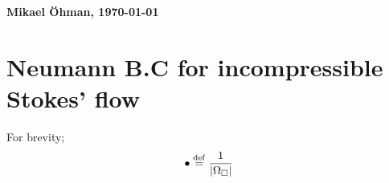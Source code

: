 \documentclass[a4paper]{article}
\newcommand{\surf}{\mathrm{s}}
\newcommand{\pore}{\mathrm{pore}}
\newcommand{\particle}{\mathrm{part}}
\begin{document}
\textbf{Mikael Öhman, \today}
\section*{Neumann B.C for incompressible Stokes' flow}
For brevity;
\begin{gather}
 \bullet \overset{\mathrm{def}}{=} \frac{1}{|\Omega_\Box|}
\end{gather}
%
% 
% 
\end{document}
